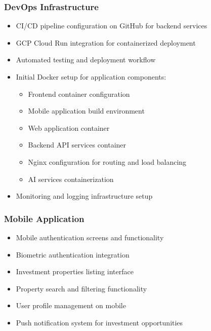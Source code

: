\subsubsection{DevOps Infrastructure}
\begin{itemize}
    \item CI/CD pipeline configuration on GitHub for backend services
    \item GCP Cloud Run integration for containerized deployment
    \item Automated testing and deployment workflow
    \item Initial Docker setup for application components:
        \begin{itemize}
            \item Frontend container configuration
            \item Mobile application build environment
            \item Web application container
            \item Backend API services container
            \item Nginx configuration for routing and load balancing
            \item AI services containerization
        \end{itemize}
    \item Monitoring and logging infrastructure setup
\end{itemize}

\subsubsection{Mobile Application}
\begin{itemize}
    \item Mobile authentication screens and functionality
    \item Biometric authentication integration
    \item Investment properties listing interface
    \item Property search and filtering functionality
    \item User profile management on mobile
    \item Push notification system for investment opportunities
\end{itemize}

